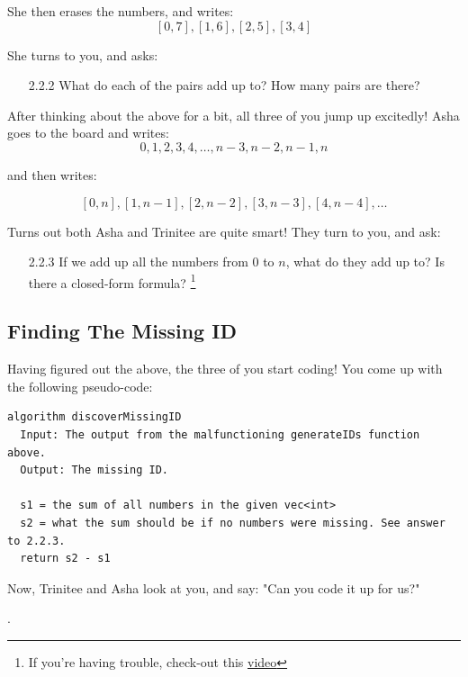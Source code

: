 \documentclass [12pt]{article}
\begin{document}
She then erases the numbers, and writes:
$$
[0, 7], [1, 6], [2, 5], [3, 4]
$$

She turns to you, and asks:

\begin{enumerate}
    \item [2.2.2]  What do each of the pairs add up to? How many pairs are there?
\end{enumerate}

After thinking about the above for a bit, all three of you jump up excitedly! Asha goes to the board and writes:
$$
0, 1, 2, 3, 4, \dots, n-3, n-2, n-1, n
$$

and then writes:

$$
[0, n], [1, n-1], [2, n-2], [3, n-3], [4, n-4], \dots
$$

Turns out both Asha and Trinitee are quite smart! They turn to you, and ask:

\begin{enumerate}
    \item [2.2.3]  If we add up all the numbers from $0$ to $n$, what do they add up to? Is there a closed-form formula? \footnote{If you're having trouble, check-out this \href{https://www.youtube.com/results?search_query=sum+of+first+n+terms}{video}}
\end{enumerate}



\subsection{Finding The Missing ID}
 Having figured out the above, the three of you start coding! You come up with the following pseudo-code:

\begin{verbatim}
algorithm discoverMissingID
  Input: The output from the malfunctioning generateIDs function above.
  Output: The missing ID.

  s1 = the sum of all numbers in the given vec<int>
  s2 = what the sum should be if no numbers were missing. See answer to 2.2.3.
  return s2 - s1
\end{verbatim}

Now, Trinitee and Asha look at you, and say: "Can you code it up for us?"

.
\end{document}
